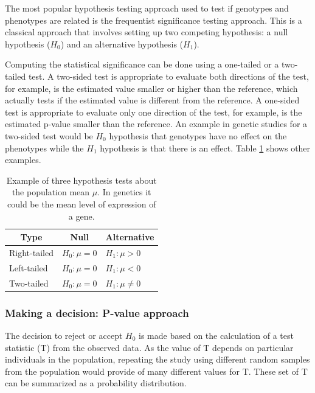 The most popular hypothesis testing approach used to test if
genotypes and phenotypes are related  is the frequentist significance testing approach.
This is a classical approach that involves setting up two competing hypothesis: a
null hypothesis ($H_0$) and an alternative hypothesis ($H_1$).

Computing the statistical significance can be done using a one-tailed or a two-tailed test.
A two-sided test is appropriate to evaluate both directions of the test, for example,
is the estimated value smaller or higher than the reference, which actually tests if the
 estimated value is different from the reference.
A one-sided test is appropriate to evaluate only one direction of the test,
for example, is the estimated p-value smaller than the reference.
An example in genetic studies for a two-sided test would be $H_0$
hypothesis that genotypes have no effect on the phenotypes
while the $H_1$ hypothesis is that there is an effect.
Table \ref{hypothesis-tests} shows other examples.

\begin{table}
\centering
\caption[Hypothesis tests]{Example of three hypothesis tests about the population mean $\mu$. In genetics it could be the mean level of expression of a gene.}
\label{hypothesis-tests}
\begin{tabular}{@{}lll@{}}
\toprule
\multicolumn{1}{c}{\textbf{Type}} & \multicolumn{1}{c}{\textbf{Null}} & \multicolumn{1}{c}{\textbf{Alternative}} \\ \midrule
Right-tailed & $H_{0}:\mu = 0$ & $H_{1}: \mu >  0 $  \\
Left-tailed & $H_{0}:\mu = 0$ & $H_{1}: \mu <  0 $  \\
Two-tailed & $H_{0}:\mu = 0$ & $H_{1}: \mu \neq 0 $ \\ \bottomrule
\end{tabular}
\end{table}

\subsubsection{Making a decision: P-value approach}

The decision to reject or accept $H_0$ is made based on the calculation of a test statistic (T) from the observed data.
As the value of T depends on particular individuals in the population, repeating the study
using  different random samples from the population would provide of many different values for T.
These set of T can be summarized as a probability distribution.

